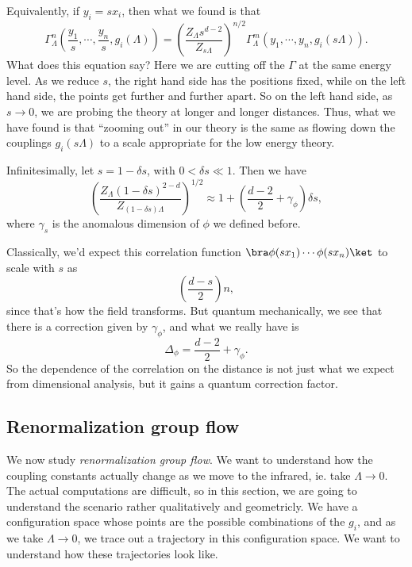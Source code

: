 \documentclass[a4paper]{article}
\begin{document}
Equivalently, if $y_i = sx_i$, then what we found is that
\[
  \Gamma_\Lambda^n \left(\frac{y_1}{s}, \cdots, \frac{y_n}{s}, g_i(\Lambda)\right) = \left(\frac{Z_\Lambda s^{d - 2}}{Z_{s\Lambda}}\right)^{n/2} \Gamma_\Lambda^m (y_1, \cdots, y_n, g_i(s\Lambda)).
\]
What does this equation say? Here we are cutting off the $\Gamma$ at the same energy level. As we reduce $s$, the right hand side has the positions fixed, while on the left hand side, the points get further and further apart. So on the left hand side, as $s \to 0$, we are probing the theory at longer and longer distances. Thus, what we have found is that ``zooming out'' in our theory is the same as flowing down the couplings $g_i(s\Lambda)$ to a scale appropriate for the low energy theory.

Infinitesimally, let $s = 1 - \delta s$, with $0 < \delta s \ll 1$. Then we have
\[
  \left(\frac{Z_\Lambda(1 - \delta s)^{2 - d}}{Z_{(1 - \delta s)\Lambda}}\right)^{1/2} \approx 1 + \left(\frac{d - 2}{2} + \gamma_\phi\right) \delta s,
\]
where $\gamma_s$ is the anomalous dimension of $\phi$ we defined before.

Classically, we'd expect this correlation function $ \bra \phi(s x_1) \cdots \phi(s x_n)\ket$ to scale with $s$ as
\[
  \left(\frac{d - s}{2}\right)n,
\]
since that's how the field transforms. But quantum mechanically, we see that there is a correction given by $\gamma_\phi$, and what we really have is
\[
  \Delta_\phi = \frac{d - 2}{2} + \gamma_\phi.
\]
So the dependence of the correlation on the distance is not just what we expect from dimensional analysis, but it gains a quantum correction factor.

\subsection{Renormalization group flow}
We now study \emph{renormalization group flow}. We want to understand how the coupling constants actually change as we move to the infrared, ie. take $\Lambda \to 0$. The actual computations are difficult, so in this section, we are going to understand the scenario rather qualitatively and geometricly. We have a configuration space whose points are the possible combinations of the $g_i$, and as we take $\Lambda \to 0$, we trace out a trajectory in this configuration space. We want to understand how these trajectories look like.
\end{document}
